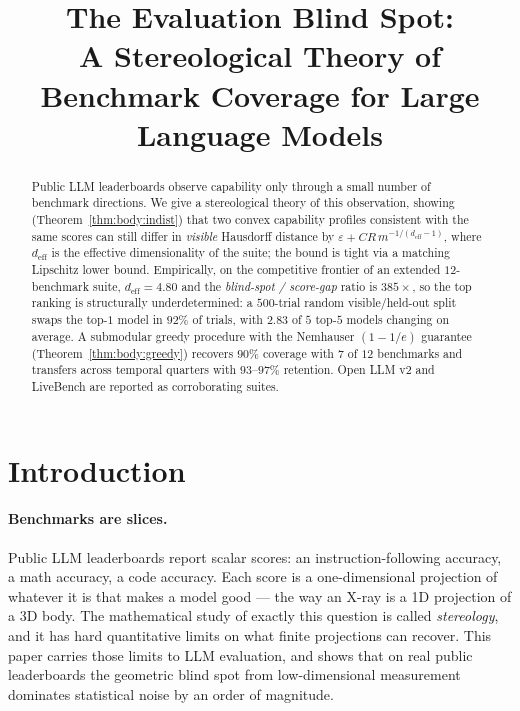 \documentclass{article}
\title{The Evaluation Blind Spot: \\
A Stereological Theory of Benchmark Coverage for Large Language Models}
\author{}
\date{}
\begin{document}
\maketitle

\begin{abstract}
Public LLM leaderboards observe capability only through a small number
of benchmark directions. We give a stereological theory of this
observation, showing (Theorem~\ref{thm:body:indist}) that two convex
capability profiles consistent with the same scores can still differ
in \emph{visible} Hausdorff distance by $\varepsilon + C R\,
m^{-1/(d_{\mathrm{eff}}-1)}$, where $d_{\mathrm{eff}}$ is the
effective dimensionality of the suite; the bound is tight via a
matching Lipschitz lower bound. Empirically, on the competitive
frontier of an extended $12$-benchmark suite, $d_{\mathrm{eff}} =
4.80$ and the \emph{blind-spot / score-gap} ratio is $385\times$, so
the top ranking is structurally underdetermined: a $500$-trial
random visible/held-out split swaps the top-$1$ model in $92\%$ of
trials, with $2.83$ of $5$ top-$5$ models changing on average.
A submodular greedy procedure with the Nemhauser $(1 - 1/e)$
guarantee (Theorem~\ref{thm:body:greedy}) recovers $90\%$ coverage
with $7$ of $12$ benchmarks and transfers across temporal quarters
with $93$--$97\%$ retention. Open LLM v2 and LiveBench are reported
as corroborating suites.
\end{abstract}

\section{Introduction}

\paragraph{Benchmarks are slices.} Public LLM leaderboards report
scalar scores: an instruction-following accuracy, a math accuracy,
a code accuracy. Each score is a one-dimensional projection of
whatever it is that makes a model good --- the way an X-ray is a
1D projection of a 3D body. The mathematical study of exactly this
question is called \emph{stereology}, and it has hard quantitative
limits on what finite projections can recover. This paper carries
those limits to LLM evaluation, and shows that on real public
leaderboards the geometric blind spot from low-dimensional
measurement dominates statistical noise by an order of magnitude.
\end{document}
